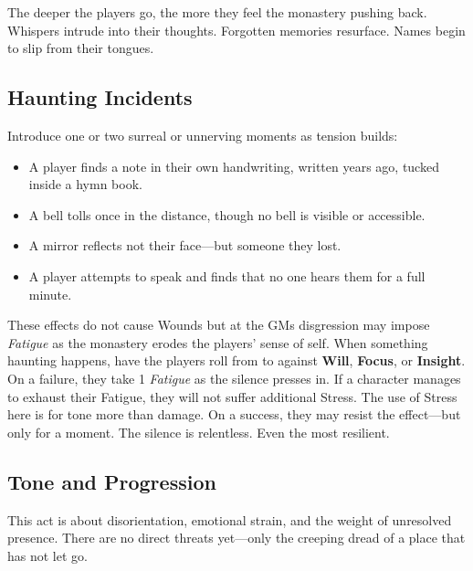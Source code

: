 \documentclass[nodeprecatedcode,bg=print]{dndbook/dndbook}
\begin{document}
The deeper the players go, the more they feel the monastery pushing back. Whispers intrude into their thoughts. Forgotten memories resurface. Names begin to slip from their tongues.

\subsection{Haunting Incidents}

Introduce one or two surreal or unnerving moments as tension builds:
\begin{WyrdExample}
\begin{itemize}
    \item A player finds a note in their own handwriting, written years ago, tucked inside a hymn book.
    \item A bell tolls once in the distance, though no bell is visible or accessible.
    \item A mirror reflects not their face—but someone they lost.
    \item A player attempts to speak and finds that no one hears them for a full minute.
\end{itemize}
\end{WyrdExample}

\begin{WyrdGmTips}
    These effects do not cause Wounds but at the GMs disgression may impose \emph{Fatigue} as the monastery erodes the players' sense of self. When something haunting happens, have the players roll from \Basic to \Difficult against  \textbf{Will}, \textbf{Focus}, or \textbf{Insight}. On a failure, they take 1 \emph{Fatigue} as the silence presses in. If a character manages to exhaust their Fatigue, they will not suffer additional Stress. The use of Stress here is for tone more than damage. On a success, they may resist the effect—but only for a moment. The silence is relentless. Even the most resilient.
\end{WyrdGmTips}





\subsection{Tone and Progression}

This act is about disorientation, emotional strain, and the weight of unresolved presence. There are no direct threats yet—only the creeping dread of a place that has not let go.
\end{document}
